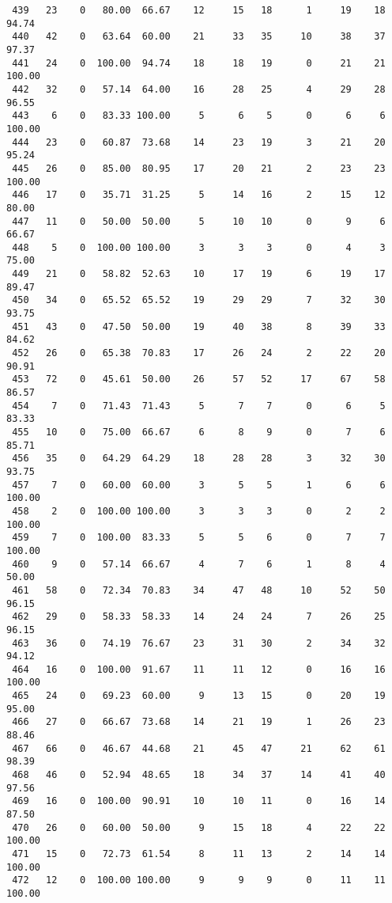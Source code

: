 \begin{verbatim}
 439   23    0   80.00  66.67    12     15   18      1     19    18    94.74
 440   42    0   63.64  60.00    21     33   35     10     38    37    97.37
 441   24    0  100.00  94.74    18     18   19      0     21    21   100.00
 442   32    0   57.14  64.00    16     28   25      4     29    28    96.55
 443    6    0   83.33 100.00     5      6    5      0      6     6   100.00
 444   23    0   60.87  73.68    14     23   19      3     21    20    95.24
 445   26    0   85.00  80.95    17     20   21      2     23    23   100.00
 446   17    0   35.71  31.25     5     14   16      2     15    12    80.00
 447   11    0   50.00  50.00     5     10   10      0      9     6    66.67
 448    5    0  100.00 100.00     3      3    3      0      4     3    75.00
 449   21    0   58.82  52.63    10     17   19      6     19    17    89.47
 450   34    0   65.52  65.52    19     29   29      7     32    30    93.75
 451   43    0   47.50  50.00    19     40   38      8     39    33    84.62
 452   26    0   65.38  70.83    17     26   24      2     22    20    90.91
 453   72    0   45.61  50.00    26     57   52     17     67    58    86.57
 454    7    0   71.43  71.43     5      7    7      0      6     5    83.33
 455   10    0   75.00  66.67     6      8    9      0      7     6    85.71
 456   35    0   64.29  64.29    18     28   28      3     32    30    93.75
 457    7    0   60.00  60.00     3      5    5      1      6     6   100.00
 458    2    0  100.00 100.00     3      3    3      0      2     2   100.00
 459    7    0  100.00  83.33     5      5    6      0      7     7   100.00
 460    9    0   57.14  66.67     4      7    6      1      8     4    50.00
 461   58    0   72.34  70.83    34     47   48     10     52    50    96.15
 462   29    0   58.33  58.33    14     24   24      7     26    25    96.15
 463   36    0   74.19  76.67    23     31   30      2     34    32    94.12
 464   16    0  100.00  91.67    11     11   12      0     16    16   100.00
 465   24    0   69.23  60.00     9     13   15      0     20    19    95.00
 466   27    0   66.67  73.68    14     21   19      1     26    23    88.46
 467   66    0   46.67  44.68    21     45   47     21     62    61    98.39
 468   46    0   52.94  48.65    18     34   37     14     41    40    97.56
 469   16    0  100.00  90.91    10     10   11      0     16    14    87.50
 470   26    0   60.00  50.00     9     15   18      4     22    22   100.00
 471   15    0   72.73  61.54     8     11   13      2     14    14   100.00
 472   12    0  100.00 100.00     9      9    9      0     11    11   100.00

\end{verbatim}
